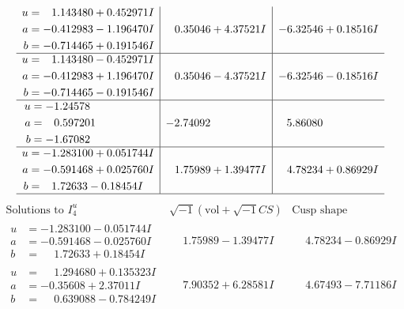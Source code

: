 \documentclass[1p]{elsarticle_modified}
\theoremstyle{definition}
\newcommand{\I}{\sqrt{-1}}
\begin{document}
$$\begin{array}{c|c|c}
\begin{aligned}
u &= \phantom{-}1.143480 + 0.452971 I \\
a &= -0.412983 - 1.196470 I \\
b &= -0.714465 + 0.191546 I\end{aligned}
 & \phantom{-}0.35046 + 4.37521 I & -6.32546 + 0.18516 I \\ \hline\begin{aligned}
u &= \phantom{-}1.143480 - 0.452971 I \\
a &= -0.412983 + 1.196470 I \\
b &= -0.714465 - 0.191546 I\end{aligned}
 & \phantom{-}0.35046 - 4.37521 I & -6.32546 - 0.18516 I \\ \hline\begin{aligned}
u &= -1.24578\phantom{ +0.000000I} \\
a &= \phantom{-}0.597201\phantom{ +0.000000I} \\
b &= -1.67082\phantom{ +0.000000I}\end{aligned}
 & -2.74092\phantom{ +0.000000I} & \phantom{-}5.86080\phantom{ +0.000000I} \\ \hline\begin{aligned}
u &= -1.283100 + 0.051744 I \\
a &= -0.591468 + 0.025760 I \\
b &= \phantom{-}1.72633 - 0.18454 I\end{aligned}
 & \phantom{-}1.75989 + 1.39477 I & \phantom{-}4.78234 + 0.86929 I\\
 \hline 
 \end{array}$$\newpage$$\begin{array}{c|c|c}  
\text{Solutions to }I^u_{4}& \I (\text{vol} + \sqrt{-1}CS) & \text{Cusp shape}\\
 \hline 
\begin{aligned}
u &= -1.283100 - 0.051744 I \\
a &= -0.591468 - 0.025760 I \\
b &= \phantom{-}1.72633 + 0.18454 I\end{aligned}
 & \phantom{-}1.75989 - 1.39477 I & \phantom{-}4.78234 - 0.86929 I \\ \hline\begin{aligned}
u &= \phantom{-}1.294680 + 0.135323 I \\
a &= -0.35608 + 2.37011 I \\
b &= \phantom{-}0.639088 - 0.784249 I\end{aligned}
 & \phantom{-}7.90352 + 6.28581 I & \phantom{-}4.67493 - 7.71186 I \\ \hline\begin{aligned}

\end{aligned}
\end{array}$$
\end{document}
